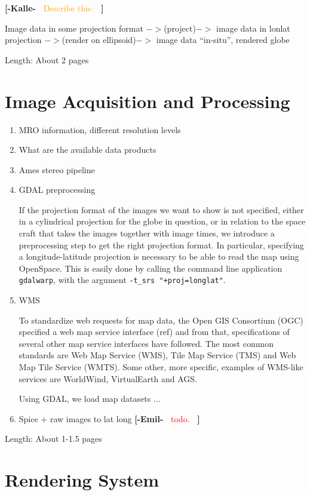 \documentclass[journal]{vgtc}                %
\newcommand{\kallecomment}[1]{\textbf{[-Kalle-~}
    \textcolor{orange}{#1}
    \textbf{~]}}
\newcommand{\emilcomment}[1]{\textbf{[-Emil-~}
    \textcolor{red}{#1}
    \textbf{~]}}
\begin{document}
\kallecomment{Describe this:}

Image data in some projection format $->$(project)$->$ image data in lonlat projection $->$(render on ellipsoid)$->$ image data ``in-situ'', rendered globe

Length: About 2 pages

\section{Image Acquisition and Processing} \label{sec:imageacquisitionprocessing}
\begin{enumerate}
  \item MRO information, different resolution levels
  \item What are the available data products
  \item Ames stereo pipeline
  \item GDAL preprocessing



If the projection format of the images we want to show is not specified, either in a cylindrical projection for the globe in question, or in relation to the space craft that takes the images together with image times, we introduce a preprocessing step to get the right projection format.
In particular, specifying a longitude-latitude projection is necessary to be able to read the map using OpenSpace.
This is easily done by calling the command line application \texttt{gdalwarp}, with the argument \texttt{-t\_srs "+proj=longlat"}.

\item WMS

To standardize web requests for map data, the Open GIS Consortium (OGC) specified a web map service interface (ref) and from that, specifications of several other map service interfaces have followed.
The most common standards are Web Map Service (WMS), Tile Map Service (TMS) and Web Map Tile Service (WMTS). Some other, more specific, examples of WMS-like services are WorldWind, VirtualEarth and AGS.

Using GDAL, we load map datasets ...
  
  \item Spice + raw images to lat long \emilcomment{todo.}
\end{enumerate}
Length: About 1-1.5 pages

\section{Rendering System} \label{sec:renderingsystem}
\end{document}
